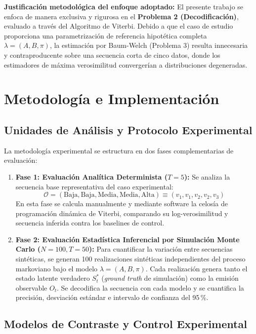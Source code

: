 \documentclass[11pt,a4paper]{article}
\begin{document}
\noindent \textbf{Justificación metodológica del enfoque adoptado:} El presente trabajo se enfoca de manera exclusiva y rigurosa en el \textbf{Problema 2 (Decodificación)}, evaluado a través del Algoritmo de Viterbi. Debido a que el caso de estudio proporciona una parametrización de referencia hipotética completa $\lambda = (A, B, \pi)$, la estimación por Baum-Welch (Problema 3) resulta innecesaria y contraproducente sobre una secuencia corta de cinco datos, donde los estimadores de máxima verosimilitud convergerían a distribuciones degeneradas.

\section{Metodología e Implementación}

\subsection{Unidades de Análisis y Protocolo Experimental}

La metodología experimental se estructura en dos fases complementarias de evaluación:

\begin{enumerate}
    \item \textbf{Fase 1: Evaluación Analítica Determinista ($T = 5$):} Se analiza la secuencia base representativa del caso experimental:
    \begin{equation}
    \mathcal{O} = (\text{Baja}, \text{Baja}, \text{Media}, \text{Media}, \text{Alta}) \equiv (v_1, v_1, v_2, v_2, v_3)
    \end{equation}
    En esta fase se calcula manualmente y mediante software la celosía de programación dinámica de Viterbi, comparando su log-verosimilitud y secuencia inferida contra los baselines de control.
    \item \textbf{Fase 2: Evaluación Estadística Inferencial por Simulación Monte Carlo ($N = 100, T = 50$):} Para cuantificar la variación entre secuencias sintéticas, se generan 100 realizaciones sintéticas independientes del proceso markoviano bajo el modelo $\lambda = (A, B, \pi)$. Cada realización genera tanto el estado latente verdadero $S_t^*$ (\textit{ground truth} de simulación) como la emisión observable $O_t$. Se decodifica la secuencia con cada modelo y se cuantifica la precisión, desviación estándar e intervalo de confianza del 95\,\%.
\end{enumerate}

\subsection{Modelos de Contraste y Control Experimental}
\end{document}
